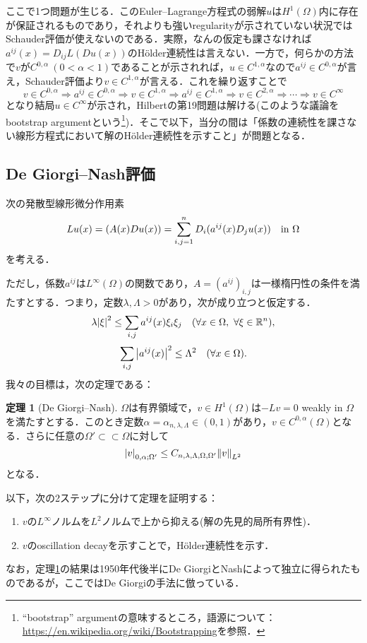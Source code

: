 \documentclass[a4paper]{ltjsarticle}
\newcommand{\Rset}{\mathbb{R}}
\newcommand{\Om}{\Omega}
\newcommand{\ssubset}{\subset\subset}
\newcommand{\inn}{\quad\text{in}\ }
\newcommand{\1}{\mathbbm{1}}
\let\div\relax
\DeclareMathOperator{\div}{\mathrm{div}}
\numberwithin{equation}{section}
\theoremstyle{definition}
\newtheorem{thm}{定理}[section]
\begin{document}
ここで1つ問題が生じる．このEuler--Lagrange方程式の弱解$u$は$H^1(\Om)$内に存在が保証されるものであり，それよりも強いregularityが示されていない状況ではSchauder評価が使えないのである．実際，なんの仮定も課さなければ$a^{ij}(x)=D_{ij}L(Du(x))$のHölder連続性は言えない．一方で，何らかの方法で$v$が$C^{0,\alpha}\ (0<\alpha<1)$であることが示されれば，$u\in C^{1,\alpha}$なので$a^{ij}\in C^{0,\alpha}$が言え，Schauder評価より$v\in C^{1,\alpha}$が言える．これを繰り返すことで
\begin{equation}
    v\in C^{0,\alpha}\Rightarrow a^{ij}\in C^{0,\alpha}\Rightarrow v\in C^{1,\alpha}\Rightarrow a^{ij}\in C^{1,\alpha}\Rightarrow v\in C^{2,\alpha}\Rightarrow \cdots \Rightarrow v\in C^{\infty}
\end{equation}
となり結局$u\in C^{\infty}$が示され，Hilbertの第19問題は解ける(このような議論をbootstrap argumentという\footnote{``bootstrap'' argumentの意味するところ，語源について：\url{https://en.wikipedia.org/wiki/Bootstrapping}を参照．})．そこで以下，当分の間は「係数の連続性を課さない線形方程式において解のHölder連続性を示すこと」が問題となる．
\subsection{De Giorgi--Nash評価}
次の発散型線形微分作用素
\begin{equation}
    Lu(x)=\div(A(x)Du(x))=\sum_{i,j=1}^{n}D_i(a^{ij}(x)D_ju(x))\inn \Om
\end{equation}
を考える．

ただし，係数$a^{ij}$は$L^\infty(\Om)$の関数であり，$A=(a^{ij})_{i,j}$は一様楕円性の条件を満たすとする．つまり，定数$\lambda,\Lambda>0$があり，次が成り立つと仮定する．
\begin{equation}
    \lambda\abs{\xi}^2\leq \sum_{i,j}a^{ij}(x)\xi_i\xi_j\quad (\forall x\in\Om,\ \forall \xi\in\Rset^n),
\end{equation}
\begin{equation}
    \sum_{i,j}\abs{a^{ij}(x)}^2\leq \Lambda^2\quad (\forall x\in\Om).
\end{equation}
我々の目標は，次の定理である：
\begin{thm}[De Giorgi--Nash]\label{thm:degiorgi_nash}
    $\Om$は有界領域で，$v\in H^1(\Om)$は$-Lv=0$ weakly in $\Om$を満たすとする．このとき定数$\alpha=\alpha_{n,\lambda,\Lambda}\in (0,1)$があり，$v\in C^{0,\alpha}(\Om)$となる．さらに任意の$\Om'\ssubset \Om$に対して
    \begin{equation}
        \abs{v}_{0,\alpha;\Om'}\leq C_{n,\lambda,\Lambda,\Om,\Om'}\norm{v}_{L^2} 
    \end{equation}
    となる．
\end{thm}
以下，次の2ステップに分けて定理を証明する：
\begin{enumerate}
    \item $v$の$L^\infty$ノルムを$L^2$ノルムで上から抑える(解の先見的局所有界性)．
    \item $v$のoscillation decayを示すことで，Hölder連続性を示す．
\end{enumerate}
なお，定理\ref{thm:degiorgi_nash}の結果は1950年代後半にDe GiorgiとNashによって独立に得られたものであるが，ここではDe Giorgiの手法に倣っている．
\end{document}
